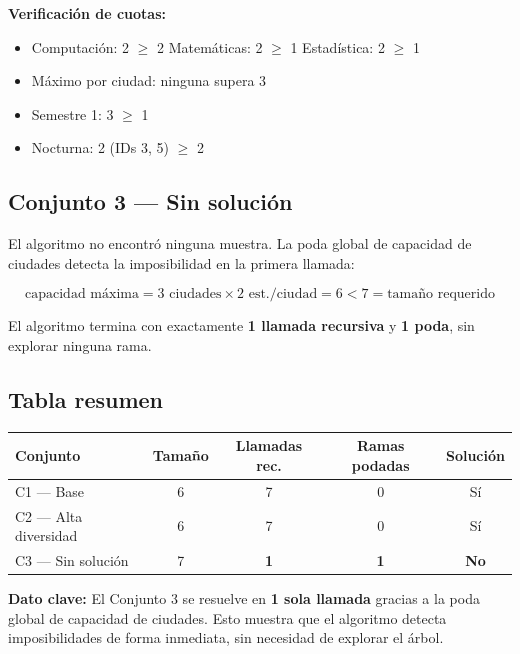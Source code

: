 \documentclass[12pt, a4paper]{article}
\begin{document}
\textbf{Verificación de cuotas:}
\begin{itemize}[noitemsep]
  \item Computación: 2 $\geq$ 2 \checkmark \quad Matemáticas: 2 $\geq$ 1 \checkmark \quad Estadística: 2 $\geq$ 1 \checkmark
  \item Máximo por ciudad: ninguna supera 3 \checkmark
  \item Semestre 1: 3 $\geq$ 1 \checkmark
  \item Nocturna: 2 (IDs 3, 5) $\geq$ 2 \checkmark
\end{itemize}

\subsection{Conjunto 3 — Sin solución}

El algoritmo no encontró ninguna muestra. La poda global de capacidad de ciudades detecta la imposibilidad en la primera llamada:

\[
  \text{capacidad máxima} = 3 \text{ ciudades} \times 2 \text{ est./ciudad} = 6 < 7 = \text{tamaño requerido}
\]

El algoritmo termina con exactamente \textbf{1 llamada recursiva} y \textbf{1 poda}, sin explorar ninguna rama.

\subsection{Tabla resumen}

\begin{center}
\begin{tabular}{lcccc}
  \toprule
  \textbf{Conjunto} & \textbf{Tamaño} & \textbf{Llamadas rec.} & \textbf{Ramas podadas} & \textbf{Solución} \\
  \midrule
  C1 — Base              & 6 & 7  & 0  & Sí \\
  C2 — Alta diversidad   & 6 & 7  & 0  & Sí \\
  C3 — Sin solución      & 7 & \textbf{1}  & \textbf{1}  & \textbf{No} \\
  \bottomrule
\end{tabular}
\end{center}

\begin{resultado}
\textbf{Dato clave:} El Conjunto 3 se resuelve en \textbf{1 sola llamada} gracias a la poda global de capacidad de ciudades. Esto muestra que el algoritmo detecta imposibilidades de forma inmediata, sin necesidad de explorar el árbol.
\end{resultado}
\end{document}
